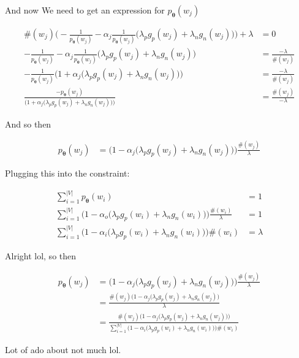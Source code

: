 \documentclass{article}
\newcommand{\vtheta}{\boldsymbol{\theta}}
\newcommand{\model}{p_{\vtheta}}
\begin{document}
		And now We need to get an expression for $\model(w_j)$
		
		\begin{align}
			\#(w_j)\bigg(-\frac{1}{\model(w_j)} -\alpha_j\frac{1}{\model(w_j)}\bigg(\lambda_p g_p(w_j) +\lambda_n g_n(w_j)\bigg) \bigg) +\lambda&= 0\\
			-\frac{1}{\model(w_j)} -\alpha_j\frac{1}{\model(w_j)}\bigg(\lambda_p g_p(w_j) +\lambda_n g_n(w_j)\bigg)  &= \frac{-\lambda}{\#(w_j)}\\
			-\frac{1}{\model(w_j)}\bigg(1 +\alpha_j\bigg(\lambda_p g_p(w_j) +\lambda_n g_n(w_j)\bigg)\bigg)  &= \frac{-\lambda}{\#(w_j)}\\
			\frac{-\model(w_j)}{\bigg(1 +\alpha_j\bigg(\lambda_p g_p(w_j) +\lambda_n g_n(w_j)\bigg)\bigg)}  &= \frac{\#(w_j)}{-\lambda}
		\end{align}
		
		And so then
		
		\begin{align}
			\model(w_j)  &= \bigg(1 -\alpha_j\bigg(\lambda_p g_p(w_j) +\lambda_n g_n(w_j)\bigg)\bigg)\frac{\#(w_j)}{\lambda}
		\end{align}
		
		Plugging this into the constraint:
		
		\begin{align}
		 	\sum^{|V|}_{i=1} \model(w_i) &= 1\\
		 	\sum^{|V|}_{i=1} \bigg(1 -\alpha_o\bigg(\lambda_p g_p(w_i) +\lambda_n g_n(w_i)\bigg)\bigg)\frac{\#(w_i)}{\lambda} &= 1\\
		 	\sum^{|V|}_{i=1} \bigg(1 -\alpha_i\bigg(\lambda_p g_p(w_i) +\lambda_n g_n(w_i)\bigg)\bigg)\#(w_i) &= \lambda
		\end{align}
		
		Alright lol, so then
		
		\begin{align}
			\model(w_j)  &= \bigg(1 -\alpha_j\bigg(\lambda_p g_p(w_j) +\lambda_n g_n(w_j)\bigg)\bigg)\frac{\#(w_j)}{\lambda}\\
			&= \frac{\#(w_j)\bigg(1 -\alpha_j\bigg(\lambda_p g_p(w_j) +\lambda_n g_n(w_j)\bigg)}{\lambda}\\
			&= \frac{\#(w_j)\bigg(1 -\alpha_j\bigg(\lambda_p g_p(w_j) +\lambda_n g_n(w_j)\bigg)\bigg)}{\sum^{|V|}_{i=1} \bigg(1 -\alpha_i\bigg(\lambda_p g_p(w_i) +\lambda_n g_n(w_i)\bigg)\bigg)\#(w_i)}
		\end{align}
		
		Lot of ado about not much lol.
		
\end{document}
